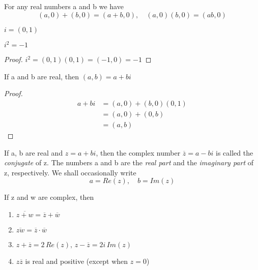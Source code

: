 \documentclass[../poma-note.tex]{subfiles}
\begin{document}
\begin{theorem}
	For any real numbers a and b we have
	\[(a,0) + (b,0) = (a+b,0), \quad (a,0)(b,0) = (ab,0)\]
\end{theorem}

\begin{definition}
	$i=(0,1)$
\end{definition}

\setcounter{poma}{27}
\begin{theorem}
	$i^2=-1$
\end{theorem}

\begin{proof}
	$i^2 = (0,1)(0,1) = (-1,0) = -1$
\end{proof}

\begin{theorem}
	If a and b are real, then $(a,b)=a+bi$
\end{theorem}

\begin{proof}
	\vspace{-26pt}
	\begin{align*}
		\mathcal{} a+bi & = (a,0) + (b,0)(0,1) \\
		                & = (a,0) + (0,b)      \\
		                & = (a,b)
	\end{align*}
\end{proof}

\begin{definition}
	If a, b are real and $z=a+bi$, then the complex number $\overline{z}=a-bi$ is called the \textit{conjugate} of z.
	The numbers a and b are the \textit{real part} and the \textit{imaginary part} of z, respectively.
	We shall occasionally write
	\[ a = Re(z),\quad b=Im(z)\]
\end{definition}

\begin{theorem}
	If z and w are complex, then
	\begin{enumerate}[label=(\alph*)]
		\item $\overline{z + w} = \overline{z} + \overline{w}$
		\item $\overline{zw} = \overline{z} \cdot \overline{w}$
		\item $z + \overline{z} = 2 \, Re(z), \, z - \overline{z} = 2i \, Im(z)$
		\item $z\overline{z}$ is real and positive (except when $z=0$)
	\end{enumerate}
\end{theorem}
\end{document}
